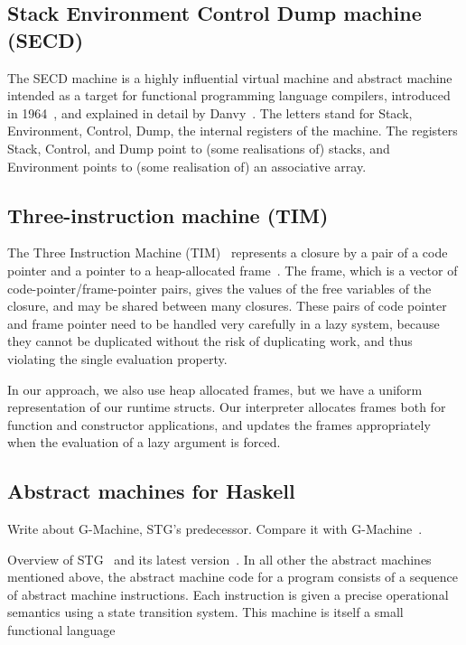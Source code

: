 \documentclass[diploma]{softlab-thesis}
\begin{document}
\subsection {Stack Environment Control Dump machine (SECD)}
\label{sec:secd}

The SECD machine is a highly influential virtual machine and abstract 
machine intended as a target for functional programming 
language compilers, introduced in 1964~\cite{La64}, and explained
in detail by Danvy~\cite{Danvy:2004:RDL:2154439.2154443}. The letters stand for Stack, Environment, 
Control, Dump, the internal registers of the machine. 
The registers Stack, Control, and Dump point to (some 
realisations of) stacks, and Environment points to (some 
realisation of) an associative array.

\subsection{Three-instruction machine (TIM)}
\label{sec:tim}

The Three Instruction Machine (TIM)~\cite{Argo89} represents a closure by a pair of a code pointer and
a pointer to a heap-allocated frame~\cite{Fairbairn87}. The frame, which is a vector
of code-pointer/frame-pointer pairs, gives the values of the free variables of the closure, and
may be shared between many closures. These pairs of code pointer and frame pointer need to be
handled very carefully in a lazy system, because they cannot be duplicated without the risk of
duplicating work, and thus violating the single evaluation property.

In our approach, we also use heap allocated frames, but we have a uniform representation 
of our runtime structs. Our interpreter allocates frames both for function and constructor 
applications, and updates the frames appropriately when the evaluation of a lazy argument is 
forced.


\subsection{Abstract machines for Haskell}
\label{sec:stg}
Write about G-Machine, STG's predecessor. Compare it with G-Machine~\cite{Jo90}.

Overview of STG~\cite{Jo92} and its latest version~\cite{Ma06}.
In all other the abstract machines mentioned above, the abstract machine code for a
program consists of a sequence of abstract machine instructions. Each instruction is
given a precise operational semantics using a state transition system.
This machine is itself a small functional language 
\end{document}
